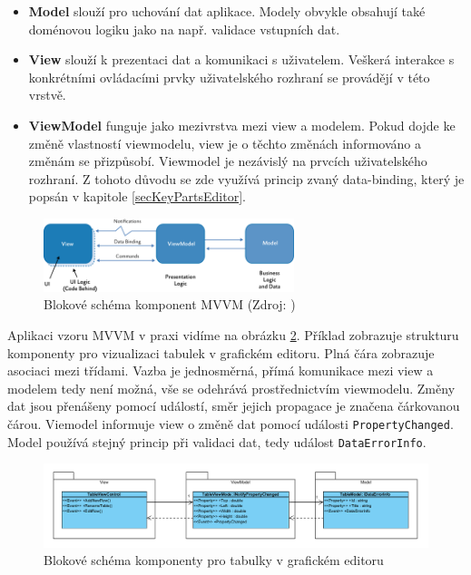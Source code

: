 \documentclass[czech,bachelor,public,dept460,male,oneside]{diploma}
\begin{document}
	\begin{itemize}
		\item \textbf{Model} slouží pro uchování dat aplikace. Modely obvykle obsahují také doménovou logiku jako na např. validace vstupních dat.
		
		\item \textbf{View} slouží k prezentaci dat a komunikaci s uživatelem. Veškerá interakce s konkrétními ovládacími prvky uživatelského rozhraní se provádějí v této vrstvě. 
		
		\item \textbf{ViewModel} funguje jako mezivrstva mezi view a modelem. Pokud dojde ke změně vlastností viewmodelu, view je o těchto změnách informováno a změnám se přizpůsobí. Viewmodel je nezávislý na prvcích uživatelského rozhraní. Z tohoto důvodu se zde využívá princip zvaný data-binding, který je popsán v kapitole \ref{secKeyPartsEditor}. 
	\end{itemize}
	
	\begin{figure}[!h]
		\centering
		\includegraphics[width=0.65\textwidth]{Figures/Mvvm}
		\caption[Blokové schéma komponent MVVM]{Blokové schéma komponent MVVM (Zdroj: \cite{mvvm})}
		\label{fig:mvvm}
	\end{figure}
	
	Aplikaci vzoru MVVM v praxi vidíme na obrázku \ref{fig:mvvmUsage}. Příklad zobrazuje strukturu komponenty pro vizualizaci tabulek v grafickém editoru. Plná čára zobrazuje asociaci mezi třídami. Vazba je jednosměrná, přímá komunikace mezi view a modelem tedy není možná, vše se odehrává prostřednictvím viewmodelu. Změny dat jsou přenášeny pomocí událostí, směr jejich propagace je značena čárkovanou čárou. Viemodel informuje view o změně dat pomocí události \texttt{PropertyChanged}. Model používá stejný princip při validaci dat, tedy událost \texttt{DataErrorInfo}.
	
	\begin{figure}[H]
		\centering
		\includegraphics[width=1\textwidth]{Figures/EditorMvvm}
		\caption[Blokové schéma komponenty pro tabulky v grafickém editoru]{Blokové schéma komponenty pro tabulky v grafickém editoru}
		\label{fig:mvvmUsage}
	\end{figure}
	
\end{document}
